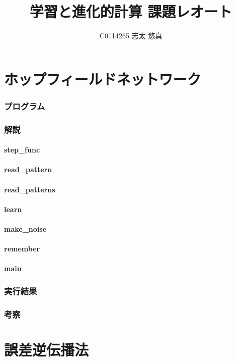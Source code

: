 \documentclass{jsarticle}
\title{学習と進化的計算 課題レオート}
\author{C0114265 志太 悠真}
\begin{document}
\maketitle

\part{ホップフィールドネットワーク}
\section{プログラム}
\section{解説}
\subsection{step\_func}
\subsection{read\_pattern}
\subsection{read\_patterns}
\subsection{learn}
\subsection{make\_noise}
\subsection{remember}
\subsection{main}
\section{実行結果}
\section{考察}

\part{誤差逆伝播法}
\end{document}
